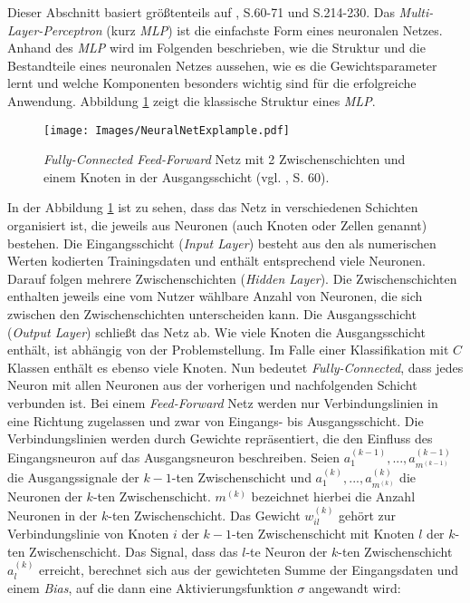 \documentclass[a4paper,11pt]{article}
\begin{document}
Dieser Abschnitt basiert größtenteils auf \cite{deepEssentials}, S.60-71 und S.214-230. %
Das \textit{Multi-Layer-Perceptron} (kurz \textit{MLP}) ist die einfachste Form eines neuronalen Netzes. Anhand des \textit{MLP} wird im Folgenden beschrieben, wie die Struktur und die Bestandteile eines neuronalen Netzes aussehen, wie es die Gewichtsparameter lernt und welche Komponenten besonders wichtig sind für die erfolgreiche Anwendung. Abbildung \ref{abb:MLPScreen} zeigt die klassische Struktur eines \textit{MLP}.


\begin{figure}[!ht]
\begin{center}
\texttt{[image: Images/NeuralNetExplample.pdf]}
\caption{\textit{Fully-Connected Feed-Forward} Netz mit 2 Zwischenschichten und einem Knoten in der Ausgangsschicht (vgl. \cite{deepEssentials}, S. 60).}
\label{abb:MLPScreen}
\end{center}
\end{figure}

In der Abbildung \ref{abb:MLPScreen} ist zu sehen, dass das Netz in verschiedenen Schichten organisiert ist, die jeweils aus Neuronen (auch Knoten oder Zellen genannt) bestehen. Die Eingangsschicht (\textit{Input Layer}) besteht aus den als numerischen Werten kodierten Trainingsdaten und enthält entsprechend viele Neuronen. Darauf folgen mehrere Zwischenschichten (\textit{Hidden Layer}). Die Zwischenschichten enthalten jeweils eine vom Nutzer wählbare Anzahl von Neuronen, die sich zwischen den Zwischenschichten unterscheiden kann. Die Ausgangsschicht (\textit{Output Layer}) schließt das Netz ab. Wie viele Knoten die Ausgangsschicht enthält, ist abhängig von der Problemstellung. Im Falle einer Klassifikation mit $C$ Klassen enthält es ebenso viele Knoten. Nun bedeutet \textit{Fully-Connected}, dass jedes Neuron mit allen Neuronen aus der vorherigen und nachfolgenden Schicht verbunden ist. Bei einem \textit{Feed-Forward} Netz werden nur Verbindungslinien in eine Richtung zugelassen und zwar von Eingangs- bis Ausgangsschicht. Die Verbindungslinien werden durch Gewichte repräsentiert, die den Einfluss des Eingangsneuron auf das Ausgangsneuron beschreiben. Seien $a_1^{(k-1)},..., a_{m^{(k-1)}}^{(k-1)}$ die Ausgangssignale der $k-1$-ten Zwischenschicht und $a_{1}^{(k)},..., a_{m^{(k)}}^{(k)}$ die Neuronen der $k$-ten Zwischenschicht. $m^{(k)}$ bezeichnet hierbei die Anzahl Neuronen in der $k$-ten Zwischenschicht. 
Das Gewicht $w_{il}^{(k)}$ gehört zur Verbindungslinie von Knoten $i$ der $k-1$-ten Zwischenschicht mit Knoten $l$ der $k$-ten Zwischenschicht. Das Signal, dass das $l$-te Neuron der $k$-ten Zwischenschicht $a_{l}^{(k)}$ erreicht, berechnet sich aus der gewichteten Summe der Eingangsdaten und einem \textit{Bias}, auf die dann eine Aktivierungsfunktion $\sigma$ angewandt wird:
\end{document}
